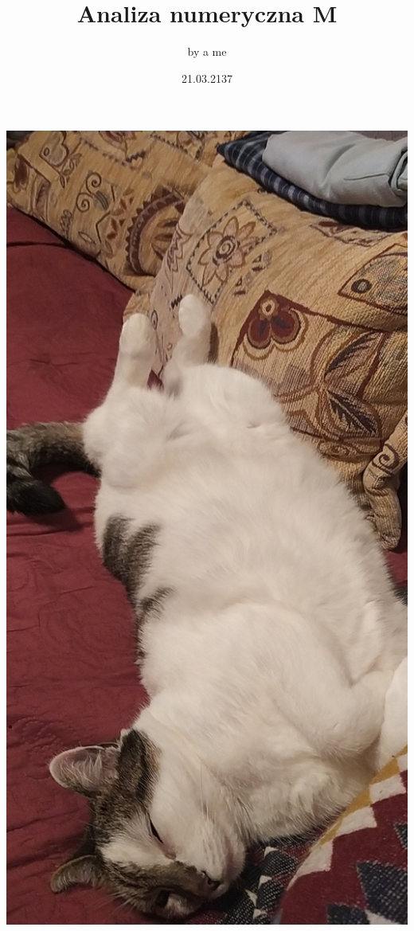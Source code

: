 \documentclass{article}[13pt]
\title {Analiza numeryczna M}
\author{by a me}
\date {21.03.2137}
\begin{document}
\maketitle

\newpage

\begin{center}
\includegraphics[height=\textheight]{./kycia.jpg}
\end{center}

\newpage

\tableofcontents

\newpage
\end{document}
